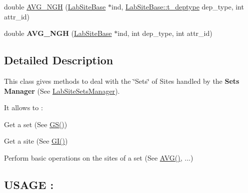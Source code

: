 \begin{DoxyCompactItemize}
\item 
double \hyperlink{classelps_1_1_lab_site_sets_calculator_a9e730ec7ca8fc42834cc92c56a15e9f9}{A\+V\+G\+\_\+\+N\+G\+H} (\hyperlink{classelps_1_1_lab_site_base}{Lab\+Site\+Base} $\ast$ind, \hyperlink{classelps_1_1_lab_site_base_a8ec08fafa015dfa53827d985608afe58}{Lab\+Site\+Base\+::t\+\_\+deptype} dep\+\_\+type, int attr\+\_\+id)
\item 
\hypertarget{classelps_1_1_lab_site_sets_calculator_a888b7e8257c845b62b6eeedcd0b9fdc7}{double {\bfseries A\+V\+G\+\_\+\+N\+G\+H} (\hyperlink{classelps_1_1_lab_site_base}{Lab\+Site\+Base} $\ast$ind, int dep\+\_\+type, int attr\+\_\+id)}\label{classelps_1_1_lab_site_sets_calculator_a888b7e8257c845b62b6eeedcd0b9fdc7}

\end{DoxyCompactItemize}


\subsection{Detailed Description}
This class gives methods to deal with the \char`\"{}\+Sets\char`\"{} of Sites handled by the {\bfseries Sets Manager} (See \hyperlink{classelps_1_1_lab_site_sets_manager}{Lab\+Site\+Sets\+Manager}).~\newline


It allows to \+:
\begin{DoxyItemize}
\item Get a set (See \hyperlink{classelps_1_1_lab_site_sets_calculator_a3a56fb6bbb50896eba98aa8ffbf56d53}{G\+S()})
\item Get a site (See \hyperlink{classelps_1_1_lab_site_sets_calculator_a4d9a4b4ee46bf9d16480a7d3ed127e55}{G\+I()})
\item Perform basic operations on the sites of a set (See \hyperlink{classelps_1_1_lab_site_sets_calculator_adea86bfd1715f7a2ec7878faa931d0bc}{A\+V\+G()}, ...)
\end{DoxyItemize}

\subsection*{U\+S\+A\+G\+E \+: }


